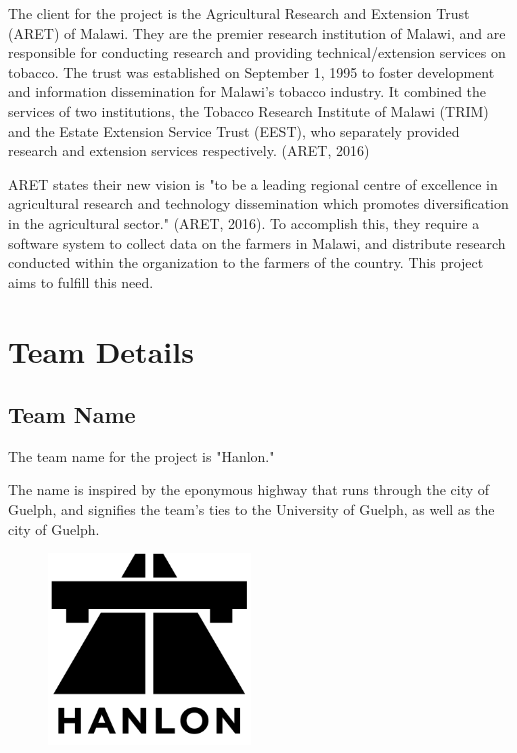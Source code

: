 \documentclass[12pt,letterpaper]{article}
\begin{document}
The client for the project is the Agricultural Research and Extension Trust (ARET) of Malawi. They are the premier research institution of Malawi, and are responsible for conducting research and providing technical/extension services on tobacco. The trust was established on September 1, 1995 to foster development and information dissemination for Malawi's tobacco industry. It combined the services of two institutions, the Tobacco Research Institute of Malawi (TRIM) and the Estate Extension Service Trust (EEST), who separately provided research and extension services respectively. (ARET, 2016)

ARET states their new vision is "to be a leading regional centre of excellence in agricultural research and technology dissemination which promotes diversification in the agricultural sector." (ARET, 2016). To accomplish this, they require a software system to collect data on the farmers in Malawi, and distribute research conducted within the organization to the farmers of the country. This project aims to fulfill this need.

\clearpage
\section{Team Details}
\subsection{Team Name}
The team name for the project is "Hanlon."\par
The name is inspired by the eponymous highway that runs through the city of Guelph, and signifies the team's ties to the University of Guelph, as well as the city of Guelph.\\

\begin{figure}[H]
	\centering	
	\includegraphics[height=2in]{img/hanlon-logo.png}
	\label{fig:kitten}
\end{figure}
\end{document}
